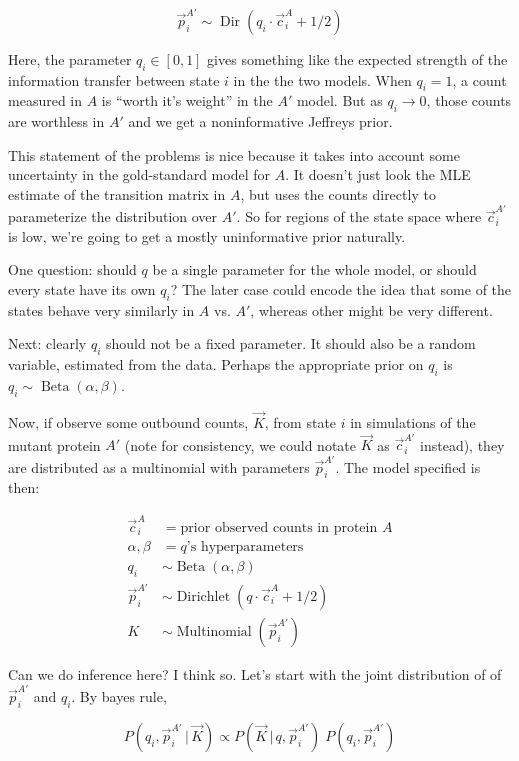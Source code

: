 \documentclass[twocolumn,floatfix,nofootinbib,aps]{revtex4-1}
\renewcommand{\vert}{\, | \,}
\begin{document}
$$
\vec{p}_i^{A'} \sim \operatorname{Dir}(q_i \cdot \vec{c}_i^A + 1/2)
$$

Here, the parameter $q_i \in [0,1]$ gives something like the expected strength of the information transfer between state $i$ in the the two models. When $q_i=1$, a count measured in $A$ is ``worth it's weight'' in the $A'$ model. But as $q_i \rightarrow 0$, those counts are worthless in $A'$ and we get a noninformative Jeffreys prior.

This statement of the problems is nice because it takes into account some uncertainty in the gold-standard model for $A$. It doesn't just look the MLE estimate of the transition matrix in $A$, but uses the counts directly to parameterize the distribution over $A'$. So for regions of the state space where $\vec{c}_i^{A'}$ is low, we're going to get a mostly uninformative prior naturally.

One question: should $q$ be a single parameter for the whole model, or should every state have its own $q_i$? The later case could encode the idea that some of the states behave very similarly in $A$ vs. $A'$, whereas other might be very different.

Next: clearly $q_i$ should not be a fixed parameter. It should also be a random variable, estimated from the data. Perhaps the appropriate prior on $q_i$ is $q_i \sim \operatorname{Beta}(\alpha, \beta)$.

Now, if observe some outbound counts, $\vec{K}$, from state $i$ in simulations of the mutant protein $A'$ (note for consistency, we could notate $\vec{K}$ as $\vec{c}_i^{A'}$ instead), they are distributed as a multinomial with parameters $\vec{p}_i^{A'}$. The model specified is then:
 
\begin{align*}
    \vec{c}_i^A &= \text{prior observed counts in protein $A$}\\
    \alpha, \beta &= \text{$q$'s hyperparameters}\\
    q_i &\sim \operatorname{Beta}(\alpha, \beta) \\
    \vec{p}_i^{A'} &\sim \operatorname{Dirichlet}(q \cdot \vec{c}_i^A + 1/2)\\
    K &\sim \operatorname{Multinomial}(\vec{p}_i^{A'})
\end{align*}

Can we do inference here? I think so. Let's start with the joint distribution of of $\vec{p}_i^{A'}$ and $q_i$. By bayes rule,

$$
P(q_i, \vec{p}_i^{A'} \vert \vec{K}) \propto P(\vec{K} \vert q, \vec{p}_i^{A'}) \;  P(q_i, \vec{p}_i^{A'})
$$
\end{document}
